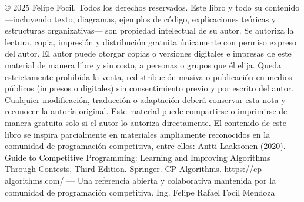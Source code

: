 \markdownRendererDocumentBegin
\markdownRendererSectionBegin
{}\markdownRendererInterblockSeparator
{}© 2025 Felipe Focil. Todos los derechos reservados.\markdownRendererParagraphSeparator
{}Este libro y todo su contenido —incluyendo texto, diagramas, ejemplos de código, explicaciones teóricas y estructuras organizativas— son propiedad intelectual de su autor.\markdownRendererParagraphSeparator
{}Se autoriza la lectura, copia, impresión y distribución gratuita únicamente con permiso expreso del autor.\markdownRendererSoftLineBreak
{}El autor puede otorgar copias o versiones digitales e impresas de este material de manera libre y sin costo, a personas o grupos que él elija.\markdownRendererParagraphSeparator
{}Queda estrictamente prohibida la venta, redistribución masiva o publicación en medios públicos (impresos o digitales) sin consentimiento previo y por escrito del autor. Cualquier modificación, traducción o adaptación deberá conservar esta nota y reconocer la autoría original.\markdownRendererParagraphSeparator
{}Este material puede compartirse o imprimirse de manera gratuita solo si el autor lo autoriza directamente.\markdownRendererInterblockSeparator
{}\markdownRendererSectionBegin
{}\markdownRendererInterblockSeparator
{}El contenido de este libro se inspira parcialmente en materiales ampliamente reconocidos en la comunidad de programación competitiva, entre ellos:\markdownRendererParagraphSeparator
{}Antti Laaksonen (2020). Guide to Competitive Programming: Learning and Improving Algorithms Through Contests, Third Edition. Springer.\markdownRendererParagraphSeparator
{}CP-Algorithms. https://cp-algorithms.com/\markdownRendererSoftLineBreak
{}— Una referencia abierta y colaborativa mantenida por la comunidad de programación competitiva.\markdownRendererInterblockSeparator
{}
\markdownRendererSectionEnd 
\markdownRendererSectionEnd \markdownRendererSectionBegin
{}\markdownRendererInterblockSeparator
{}\markdownRendererSectionBegin
\markdownRendererSectionBegin
{}\markdownRendererInterblockSeparator
{}\markdownRendererUlBeginTight
\markdownRendererUlItem Ing. Felipe Rafael Focil Mendoza\markdownRendererUlItemEnd 
\markdownRendererUlEndTight \markdownRendererInterblockSeparator
{}
\markdownRendererSectionEnd \markdownRendererSectionBegin
{}\markdownRendererInterblockSeparator
{}\markdownRendererUlBeginTight

